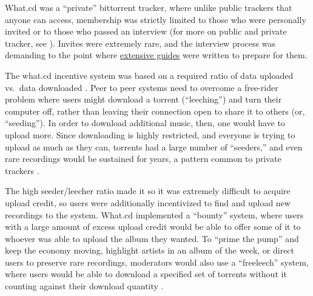\documentclass[10pt]{article}
\begin{document}
\begin{multicols}{2}
What.cd was a ``private'' bittorrent tracker, where unlike public
trackers that anyone can access, membership was strictly limited to
those who were personally invited or to those who passed an interview
(for more on public and private tracker, see \cite{meulpolderPublicPrivateBitTorrent} ). Invites were extremely rare,
and the interview process was demanding to the point where
\href{https://opentrackers.org/whatinterviewprep.com/index.html}{extensive
guides} were written to prepare for them.

The what.cd incentive system was based on a required ratio of data
uploaded vs.~data downloaded \cite{jiaHowSurviveThrive2013} .
Peer to peer systems need to overcome a free-rider problem where users
might download a torrent (``leeching'') and turn their computer off,
rather than leaving their connection open to share it to others (or,
``seeding''). In order to download additional music, then, one would
have to upload more. Since downloading is highly restricted, and
everyone is trying to upload as much as they can, torrents had a large
number of ``seeders,'' and even rare recordings would be sustained for
years, a pattern common to private trackers \cite{liuUnderstandingImprovingRatio2010} .

The high seeder/leecher ratio made it so it was extremely difficult to
acquire upload credit, so users were additionally incentivized to find
and upload new recordings to the system. What.cd implemented a
``bounty'' system, where users with a large amount of excess upload
credit would be able to offer some of it to whoever was able to upload
the album they wanted. To ``prime the pump'' and keep the economy
moving, highlight artists in an album of the week, or direct users to
preserve rare recordings, moderators would also use a ``freeleech''
system, where users would be able to download a specified set of
torrents without it counting against their download quantity \cite{kashEconomicsBitTorrentCommunities2012, chenImprovingSustainabilityPrivate2011a} .


\end{multicols}
\end{document}
